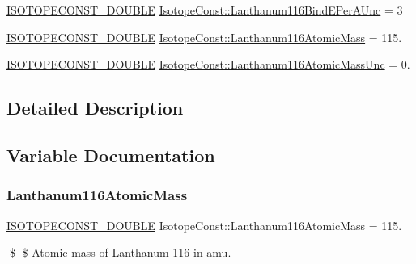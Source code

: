 \begin{DoxyCompactItemize}
\mbox{\hyperlink{group___isotope_const-_macros_ga8f45a7272ce02c0b4c65c44636ed719a}{I\+S\+O\+T\+O\+P\+E\+C\+O\+N\+S\+T\+\_\+\+D\+O\+U\+B\+LE}} \mbox{\hyperlink{group___isotope_const-_lanthanum-_la116_gae2bcf3ee234708aa81572b7caa7ad5fb}{Isotope\+Const\+::\+Lanthanum116\+Bind\+E\+Per\+A\+Unc}} = 3
\item 
\mbox{\hyperlink{group___isotope_const-_macros_ga8f45a7272ce02c0b4c65c44636ed719a}{I\+S\+O\+T\+O\+P\+E\+C\+O\+N\+S\+T\+\_\+\+D\+O\+U\+B\+LE}} \mbox{\hyperlink{group___isotope_const-_lanthanum-_la116_gaafa543fb4e950da71ced35ce76215d01}{Isotope\+Const\+::\+Lanthanum116\+Atomic\+Mass}} = 115.
\item 
\mbox{\hyperlink{group___isotope_const-_macros_ga8f45a7272ce02c0b4c65c44636ed719a}{I\+S\+O\+T\+O\+P\+E\+C\+O\+N\+S\+T\+\_\+\+D\+O\+U\+B\+LE}} \mbox{\hyperlink{group___isotope_const-_lanthanum-_la116_ga1772353f04763e261429df71eb1a38d6}{Isotope\+Const\+::\+Lanthanum116\+Atomic\+Mass\+Unc}} = 0.
\end{DoxyCompactItemize}


\subsection{Detailed Description}


\subsection{Variable Documentation}
\mbox{\label{group___isotope_const-_lanthanum-_la116_gaafa543fb4e950da71ced35ce76215d01}} 
\subsubsection{\texorpdfstring{Lanthanum116\+Atomic\+Mass}{Lanthanum116AtomicMass}}
{\footnotesize\ttfamily \mbox{\hyperlink{group___isotope_const-_macros_ga8f45a7272ce02c0b4c65c44636ed719a}{I\+S\+O\+T\+O\+P\+E\+C\+O\+N\+S\+T\+\_\+\+D\+O\+U\+B\+LE}} Isotope\+Const\+::\+Lanthanum116\+Atomic\+Mass = 115.}

\$ \$ Atomic mass of Lanthanum-\/116 in amu. \mbox{\label{group___isotope_const-_lanthanum-_la116_ga1772353f04763e261429df71eb1a38d6}} 
